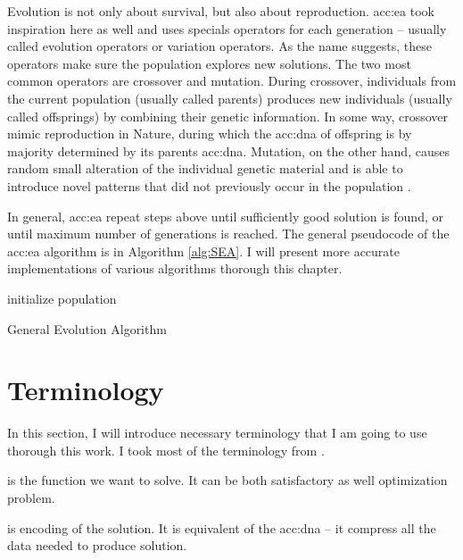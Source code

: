 Evolution is not only about survival, but also about reproduction. \acrlong*{acc:ea} took inspiration here as well and uses specials operators for each generation -- usually called evolution operators or variation operators. As the name suggests, these operators make sure the population explores new solutions. The two most common operators are crossover and mutation. During crossover, individuals from the current population (usually called parents) produces new individuals (usually called offsprings) by combining their genetic information. In some way, crossover mimic reproduction in Nature, during which the \acrshort{acc:dna} of offspring is by majority determined by its parents \acrshort{acc:dna}. Mutation, on the other hand, causes random small alteration of the individual genetic material and is able to introduce novel patterns that did not previously occur in the population \citep{HowToSolveItModernHeuristics}.

In general, \acrshort{acc:ea} repeat steps above until sufficiently good solution is found, or until maximum number of generations is reached. The general pseudocode of the \acrshort{acc:ea} algorithm is in Algorithm \ref{alg:SEA}. I will present more accurate implementations of various algorithms thorough this chapter.

\begin{algorithm}
    \SetAlgoLined
    initialize population\;
    \caption{General Evolution Algorithm}
    \label{alg:SEA}
\end{algorithm}


\section{Terminology}

In this section, I will introduce necessary terminology that I am going to use thorough this work. I took most of the terminology from \citet{IntroductionToEA}.

 is the function we want to solve. It can be both satisfactory as well optimization problem.

 is encoding of the solution. It is equivalent of the \acrshort{acc:dna} -- it compress all the data needed to produce solution.

